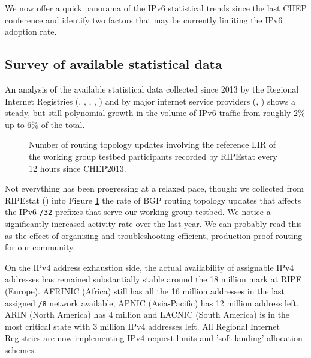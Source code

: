 We now offer a quick panorama of the IPv6 statistical trends since the last
CHEP conference and identify two factors that may be currently limiting 
the IPv6 adoption rate. 
\subsection{Survey of available statistical data}
An analysis of the available statistical data collected since 2013
by the Regional Internet Registries (\cite{ripeipv6}, \cite{arinstat}, \cite{apnicstat}, \cite{afrinicipv6}, \cite{lacnicipc6}) and by major internet
service providers (\cite{akamaistats}, \cite{googlestats}) shows a steady, but
still polynomial growth in the volume of IPv6 traffic from roughly 
2\% up to 6\% of the total. 
\begin{figure}
\centering
\def\svgwidth{\columnwidth}

\caption{Number of routing topology updates involving the reference LIR of the working group testbed participants recorded by RIPEstat \cite{ripestat} every 12 hours since CHEP2013.}
\label{fig:bgpupdates}
\end{figure}
Not everything has been progressing at a relaxed pace, though: we collected from RIPEstat (\cite{ripestat}) into Figure \ref{fig:bgpupdates} the
rate of BGP routing topology updates that affects
the IPv6 {\tt/32} prefixes that serve our
working group testbed. We notice a significantly increased activity rate over the
last year. We can probably read this as the effect of organising and troubleshooting efficient, production-proof routing for our community.\par
On the IPv4 address exhaustion side, the actual availability of
assignable IPv4 addresses has remained substantially stable around the 18 million mark at RIPE (Europe). AFRINIC (Africa) still has all the 16 million addresses in the last assigned {\tt /8} network available, APNIC (Asia-Pacific) has 12 million address left, ARIN (North America) has 4 million and LACNIC (South America) is in
the most critical state with 3 million IPv4 addresses left.
All Regional Internet Registries are
now implementing IPv4 request limits and 'soft landing' allocation schemes.
